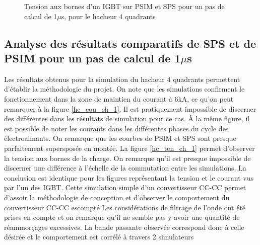 \begin{figure}[htb]
\caption{Tension aux bornes d'un IGBT sur PSIM et SPS pour un pas de calcul de 1$\mu$s, pour le hacheur 4 quadrants}
\label{hc_IG_ten_1}
\end{figure}


\clearpage
\subsection{Analyse des résultats comparatifs de SPS et de PSIM pour un pas de calcul de 1$\mu$s}

Les résultats obtenus pour la simulation du hacheur 4 quadrants permettent d'établir la méthodologie du projet. On note que les simulations confirment le fonctionnement dans la zone de maintien du courant à 6kA, ce qu'on peut remarquer à la figure \ref{hc_cou_ch_1}. Il est pratiquement impossible de discerner des différentes dans les résultats de simulation pour ce cas. À la même figure, il est possible de noter les courants dans les différentes phases du cycle des électroaimants. On remarque que les courbes de PSIM et SPS sont presque parfaitement supersposée en montée. La figure \ref{hc_ten_ch_1} permet d'observer la tension aux bornes de la charge. On remarque qu'il est presque impossible de discerner une différence à l'échelle de la commutation entre les simulations. La conclusion est identique pour les figures représentant la tension et le courant vus par l'un des IGBT. Cette simulation simple d'un convertisseur CC-CC permet d'assoir la méthodologie de conception et d'observer le comportement du convertisseur CC-CC escompté Les considérations de filtrage de l'onde ont été prises en compte et on remarque qu'il ne semble pas y avoir une quantité de réammorçages excessives. La bande passante observée correspond donc à celle désirée et le comportement est corrélé à travers 2 simulateurs




